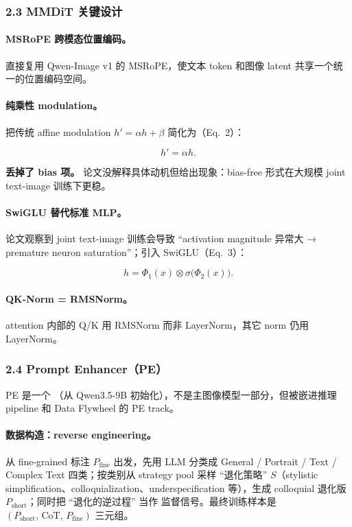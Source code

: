 \subsubsection{2.3 MMDiT 关键设计}

\paragraph{MSRoPE 跨模态位置编码。} 直接复用 Qwen-Image v1 的 MSRoPE，使文本 token 和图像 latent 共享一个统一的位置编码空间。

\paragraph{纯乘性 modulation。} 把传统 affine modulation $h'=\alpha h + \beta$ 简化为（Eq.~2）：

\[
h' = \alpha h.
\]

\textbf{丢掉了 bias 项。} 论文没解释具体动机但给出现象：bias-free 形式在大规模 joint text-image 训练下更稳。

\paragraph{SwiGLU 替代标准 MLP。} 论文观察到 joint text-image 训练会导致 ``activation magnitude 异常大 → premature neuron saturation''；引入 SwiGLU（Eq.~3）：

\[
h = \Phi_1(x)\otimes\sigma\bigl(\Phi_2(x)\bigr).
\]

\paragraph{QK-Norm = RMSNorm。} attention 内部的 Q/K 用 RMSNorm 而非 LayerNorm，其它 norm 仍用 LayerNorm。

\subsubsection{2.4 Prompt Enhancer（PE）}

PE 是一个 （从 Qwen3.5-9B 初始化），不是主图像模型一部分，但被嵌进推理 pipeline 和 Data Flywheel 的 PE track。

\paragraph{数据构造：reverse engineering。} 从 fine-grained 标注 $P_{\text{fine}}$ 出发，先用 LLM 分类成 General / Portrait / Text / Complex Text 四类；按类别从 strategy pool 采样 ``退化策略'' $S$（stylistic simplification、colloquialization、underspecification 等），生成 colloquial 退化版 $P_{\text{short}}$；同时把 ``退化的逆过程'' 当作  监督信号。最终训练样本是 $(P_{\text{short}},\,\text{CoT},\,P_{\text{fine}})$ 三元组。

